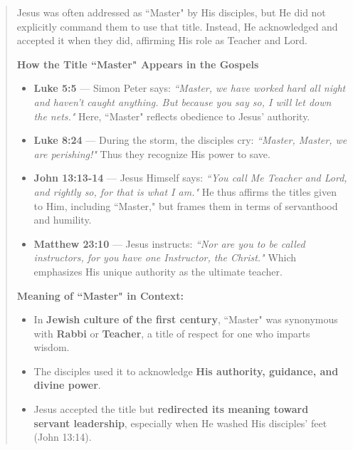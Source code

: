 \documentclass[a4paper]{article}
\begin{document}
\noindent
\begin{minipage}{1\textwidth}
\vspace{1em}
\begin{quotation}
{\ttfamily

Jesus was often addressed as ``Master" by His disciples, but He did not explicitly command them to use that title. Instead, He acknowledged and accepted it when they did, affirming His role as Teacher and Lord. 

\vspace{2em}

\textbf{How the Title ``Master" Appears in the Gospels}

\begin{itemize}
\item{ \textbf{Luke 5:5} — Simon Peter says: \textit{``Master, we have worked hard all night and haven’t caught anything. But because you say so, I will let down the nets."}  Here, ``Master" reflects obedience to Jesus’ authority. 
  }
  
 \item{
 \textbf{Luke 8:24} — During the storm, the disciples cry: \textit{``Master, Master, we are perishing!"} Thus they recognize His power to save. 
 }
 
 \item{
\textbf{John 13:13-14} — Jesus Himself says: \textit{``You call Me Teacher and Lord, and rightly so, for that is what I am."} He thus affirms the titles given to Him, including ``Master," but frames them in terms of servanthood and humility. 
 
 }
 
 \item{
\textbf{Matthew 23:10} — Jesus instructs: \textit{``Nor are you to be called instructors, for you have one Instructor, the Christ."} Which emphasizes His unique authority as the ultimate teacher.  
 }
\end{itemize}

\textbf{Meaning of ``Master" in Context:}

\begin{itemize}
\item In \textbf{Jewish culture of the first century}, ``Master" was synonymous with \textbf{Rabbi} or \textbf{Teacher}, a title of respect for one who imparts wisdom. 

\item The disciples used it to acknowledge \textbf{His authority, guidance, and divine power}.

\item  Jesus accepted the title but \textbf{redirected its meaning toward servant leadership}, especially when He washed His disciples’ feet (John 13:14). 
\end{itemize}
 


}
\end{quotation}
\vspace{1em}
\end{minipage}
\end{document}
